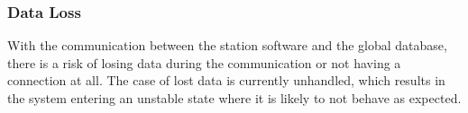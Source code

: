 \subsubsection{Data Loss}
With the communication between the station software and the global database, there is a risk of losing data during the communication or not having a connection at all.
The case of lost data is currently unhandled, which results in the system entering an unstable state where it is likely to not behave as expected. 
